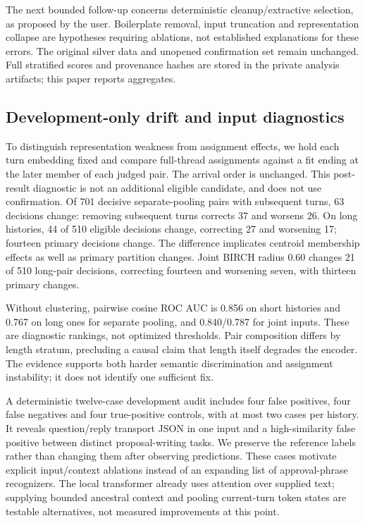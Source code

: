 \documentclass[11pt]{article}
\begin{document}
The next bounded follow-up concerns deterministic cleanup/extractive selection,
as proposed by the user. Boilerplate removal, input truncation and representation
collapse are hypotheses requiring ablations, not established explanations for
these errors. The original silver data and unopened confirmation set remain
unchanged. Full stratified scores and provenance hashes are stored in the
private analysis artifacts; this paper reports aggregates.

\subsection{Development-only drift and input diagnostics}
To distinguish representation weakness from assignment effects, we hold each
turn embedding fixed and compare full-thread assignments against a fit ending
at the later member of each judged pair. The arrival order is unchanged. This
post-result diagnostic is not an additional eligible candidate, and does not
use confirmation. Of 701 decisive separate-pooling pairs with subsequent turns,
63 decisions change: removing subsequent turns corrects 37 and worsens 26.
On long histories, 44 of 510 eligible decisions change, correcting 27 and
worsening 17; fourteen primary decisions change. The difference implicates
centroid membership effects as well as primary partition changes. Joint BIRCH
radius 0.60 changes 21 of 510 long-pair decisions, correcting fourteen and
worsening seven, with thirteen primary changes.

Without clustering, pairwise cosine ROC AUC is 0.856 on short histories and
0.767 on long ones for separate pooling, and 0.840/0.787 for joint inputs.
These are diagnostic rankings, not optimized thresholds. Pair composition
differs by length stratum, precluding a causal claim that length itself degrades
the encoder. The evidence supports both harder semantic discrimination and
assignment instability; it does not identify one sufficient fix.

A deterministic twelve-case development audit includes four false positives,
four false negatives and four true-positive controls, with at most two cases
per history. It reveals question/reply transport JSON in one input and a
high-similarity false positive between distinct proposal-writing tasks. We
preserve the reference labels rather than changing them after observing
predictions. These cases motivate explicit input/context ablations instead of
an expanding list of approval-phrase recognizers. The local transformer already
uses attention over supplied text; supplying bounded ancestral context and
pooling current-turn token states are testable alternatives, not measured
improvements at this point.
\end{document}
